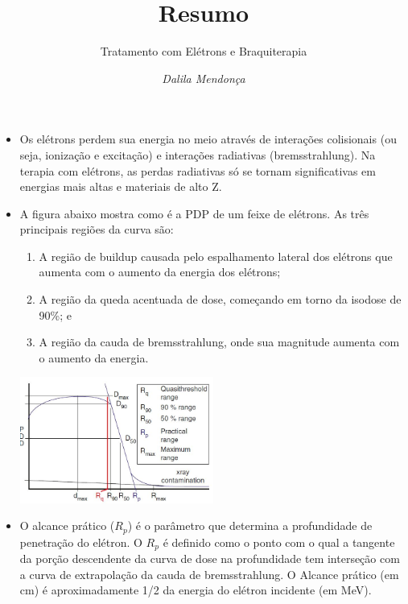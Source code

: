 \documentclass[11pt,a4paper]{article}
\title{Resumo}
\author{Tratamento com Elétrons e Braquiterapia \nocite{*}}
\date{\textit{Dalila Mendonça}}
\newcounter{exemplo}
\begin{document}
	\maketitle


\begin{exemplo}
    \begin{itemize}
        \item Os elétrons perdem sua energia no meio através de interações colisionais (ou seja, ionização e excitação) e interações radiativas (bremsstrahlung). Na terapia com elétrons, as perdas radiativas só se tornam significativas em energias mais altas e materiais de alto Z.
        
        \item A figura abaixo mostra como é a PDP de um feixe de elétrons. As três principais regiões da curva são:
        
            \begin{enumerate}[label=label=\textcolor{CarnationPink}{\roman*.}]
                \item A região de buildup causada pelo espalhamento lateral dos elétrons que aumenta com o aumento da energia dos elétrons;
                \item A região da queda acentuada de dose, começando em torno da isodose de 90\%; e 
                \item A região da cauda de bremsstrahlung, onde sua magnitude aumenta com o aumento da energia.
            \end{enumerate}
        
            \begin{center}
                \includegraphics[width=0.5\textwidth]{Imagens/pdpEletrons.JPG}
            \end{center}

        \item O alcance prático ($R_p$) é o parâmetro que determina a profundidade de penetração do elétron. O $R_p$ é definido como o ponto com o qual a tangente da porção descendente da curva de dose na profundidade tem interseção com a curva de extrapolação da cauda de bremsstrahlung. O Alcance prático (em cm) é aproximadamente 1/2 da energia do elétron incidente (em MeV).
        

\end{itemize}
\end{exemplo}
\end{document}
